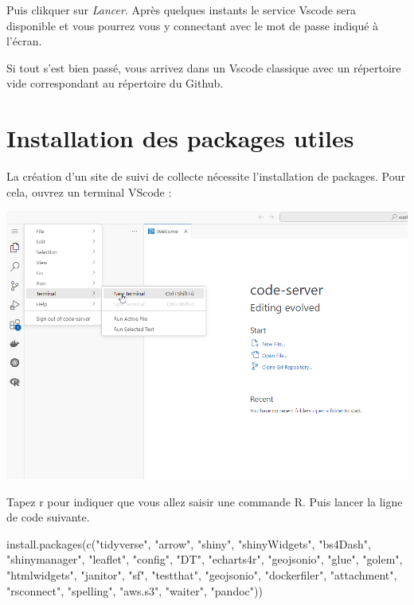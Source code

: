 \documentclass[
  letterpaper,
  DIV=11,
  numbers=noendperiod]{scrreprt}
\newenvironment{Shaded}{\begin{snugshade}}{\end{snugshade}}
\newcommand{\FunctionTok}[1]{\textcolor[rgb]{0.28,0.35,0.67}{#1}}
\newcommand{\NormalTok}[1]{\textcolor[rgb]{0.00,0.23,0.31}{#1}}
\newcommand{\StringTok}[1]{\textcolor[rgb]{0.13,0.47,0.30}{#1}}
\begin{document}
Puis clikquer sur \emph{Lancer}. Après quelques instants le service
Vscode sera disponible et vous pourrez vous y connectant avec le mot de
passe indiqué à l'écran.

Si tout s'est bien passé, vous arrivez dans un Vscode classique avec un
répertoire vide correspondant au répertoire du Github.

\hypertarget{installation-des-packages-utiles}{%
\section{Installation des packages
utiles}\label{installation-des-packages-utiles}}

La création d'un site de suivi de collecte nécessite l'installation de
packages. Pour cela, ouvrez un terminal VScode :

\includegraphics{./images/VSCode_new_terminal.png}

Tapez r pour indiquer que vous allez saisir une commande R. Puis lancer
la ligne de code suivante.

\begin{Shaded}
\begin{Highlighting}[]
\FunctionTok{install.packages}\NormalTok{(}\FunctionTok{c}\NormalTok{(}\StringTok{"tidyverse"}\NormalTok{, }\StringTok{"arrow"}\NormalTok{, }\StringTok{"shiny"}\NormalTok{, }\StringTok{"shinyWidgets"}\NormalTok{, }\StringTok{"bs4Dash"}\NormalTok{, }\StringTok{"shinymanager"}\NormalTok{, }\StringTok{"leaflet"}\NormalTok{, }\StringTok{"config"}\NormalTok{, }\StringTok{"DT"}\NormalTok{, }\StringTok{"echarts4r"}\NormalTok{, }\StringTok{"geojsonio"}\NormalTok{, }\StringTok{"glue"}\NormalTok{, }\StringTok{"golem"}\NormalTok{, }\StringTok{"htmlwidgets"}\NormalTok{, }\StringTok{"janitor"}\NormalTok{, }\StringTok{"sf"}\NormalTok{, }\StringTok{"testthat"}\NormalTok{, }\StringTok{"geojsonio"}\NormalTok{, }\StringTok{"dockerfiler"}\NormalTok{, }\StringTok{"attachment"}\NormalTok{, }\StringTok{"rsconnect"}\NormalTok{, }\StringTok{"spelling"}\NormalTok{, }\StringTok{"aws.s3"}\NormalTok{, }\StringTok{"waiter"}\NormalTok{, }\StringTok{"pandoc"}\NormalTok{))}
\end{Highlighting}
\end{Shaded}
\end{document}
